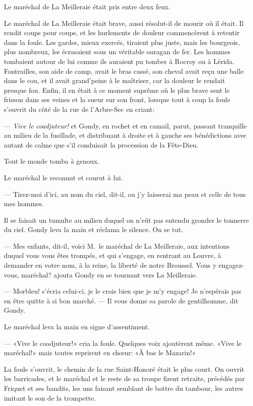 Le maréchal de La Meilleraie était pris entre deux feux.

Le maréchal de La Meilleraie était brave, aussi résolut-il de mourir où il était. Il rendit coups pour coups, et les hurlements de douleur commencèrent à retentir dans la foule. Les gardes, mieux exercés, tiraient plus juste, mais les bourgeois, plus nombreux, les écrasaient sous un véritable ouragan de fer. Les hommes tombaient autour de lui comme ils auraient pu tomber à Rocroy ou à Lérida. Fontrailles, son aide de camp, avait le bras cassé, son cheval avait reçu une balle dans le cou, et il avait grand'peine à le maîtriser, car la douleur le rendait presque fou. Enfin, il en était à ce moment suprême où le plus brave sent le frisson dans ses veines et la sueur sur son front, lorsque tout à coup la foule s'ouvrit du côté de la rue de l'Arbre-Sec en criant:

— \textit{Vive le coadjuteur!} et Gondy, en rochet et en camail, parut, passant tranquille au milieu de la fusillade, et distribuant à droite et à gauche ses bénédictions avec autant de calme que s'il conduisait la procession de la Fête-Dieu.

Tout le monde tomba à genoux.

Le maréchal le reconnut et courut à lui.

— Tirez-moi d'ici, au nom du ciel, dit-il, ou j'y laisserai ma peau et celle de tous mes hommes.

Il se faisait un tumulte au milieu duquel on n'eût pas entendu gronder le tonnerre du ciel. Gondy leva la main et réclama le silence. On se tut.

— Mes enfants, dit-il, voici M.~le maréchal de La Meilleraie, aux intentions duquel vous vous êtes trompés, et qui s'engage, en rentrant au Louvre, à demander en votre nom, à la reine, la liberté de notre Broussel. Vous y engagez-vous, maréchal? ajouta Gondy en se tournant vers La Meilleraie.

— Morbleu! s'écria celui-ci, je le crois bien que je m'y engage! Je n'espérais pas en être quitte à si bon marché.
— Il vous donne sa parole de gentilhomme, dit Gondy.

Le maréchal leva la main en signe d'assentiment.

— «Vive le coadjuteur!» cria la foule. Quelques voix ajoutèrent même. «Vive le maréchal!» mais toutes reprirent en chœur: «À bas le Mazarin!»

La foule s'ouvrit, le chemin de la rue Saint-Honoré était le plus court. On ouvrit les barricades, et le maréchal et le reste de sa troupe firent retraite, précédés par Friquet et ses bandits, les uns faisant semblant de battre du tambour, les autres imitant le son de la trompette.

